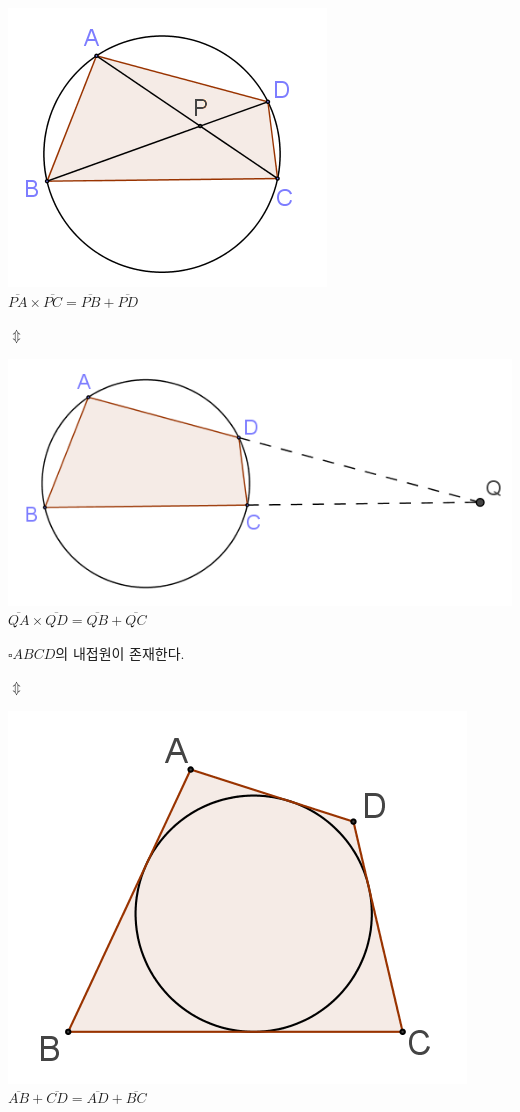\documentclass[twocolumn]{article}
\newcommand\ov[2]{\ensuremath{\overline{#1#2}}}
\begin{document}
\begin{mdframed}
\includegraphics{3}\\
\(\ov PA\times\ov PC=\ov PB+\ov PD\)
\end{mdframed}

\(\Updownarrow\)

\begin{mdframed}
\includegraphics{4}\\
\(\ov QA\times\ov QD=\ov QB+\ov QC\)
\end{mdframed}

\newpage
\begin{mdframed}
\(\square ABCD\)의 내접원이 존재한다.
\end{mdframed}

\(\Updownarrow\)

\begin{mdframed}
\includegraphics{5}\\
\(\ov AB+\ov CD=\ov AD+\ov BC\)
\end{mdframed}
\end{document}
